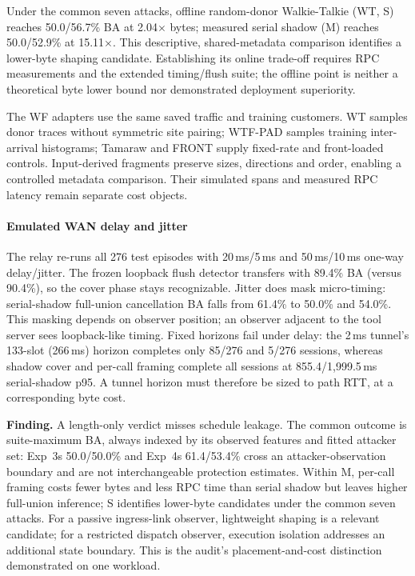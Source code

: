 Under the common seven attacks, offline random-donor Walkie-Talkie (WT, S) reaches 50.0/56.7\% BA at 2.04$\times$ bytes; measured serial shadow (M) reaches 50.0/52.9\% at 15.11$\times$. This descriptive, shared-metadata comparison identifies a lower-byte shaping candidate. Establishing its online trade-off requires RPC measurements and the extended timing/flush suite; the offline point is neither a theoretical byte lower bound nor demonstrated deployment superiority.

The WF adapters use the same saved traffic and training customers. WT samples donor traces without symmetric site pairing; WTF-PAD samples training inter-arrival histograms; Tamaraw and FRONT supply fixed-rate and front-loaded controls. Input-derived fragments preserve sizes, directions and order, enabling a controlled metadata comparison. Their simulated spans and measured RPC latency remain separate cost objects.

\paragraph{Emulated WAN delay and jitter}
The relay re-runs all 276 test episodes with 20\,ms/5\,ms and 50\,ms/10\,ms one-way delay/jitter. The frozen loopback flush detector transfers with 89.4\% BA (versus 90.4\%), so the cover phase stays recognizable. Jitter does mask micro-timing: serial-shadow full-union cancellation BA falls from 61.4\% to 50.0\% and 54.0\%. This masking depends on observer position; an observer adjacent to the tool server sees loopback-like timing. Fixed horizons fail under delay: the 2\,ms tunnel's 133-slot (266\,ms) horizon completes only 85/276 and 5/276 sessions, whereas shadow cover and per-call framing complete all sessions at 855.4/1,999.5\,ms serial-shadow p95. A tunnel horizon must therefore be sized to path RTT, at a corresponding byte cost.

\textbf{Finding.} A length-only verdict misses schedule leakage. The common outcome is suite-maximum BA, always indexed by its observed features and fitted attacker set: Exp~3\textquotesingle s 50.0/50.0\% and Exp~4\textquotesingle s 61.4/53.4\% cross an attacker-observation boundary and are not interchangeable protection estimates. Within M, per-call framing costs fewer bytes and less RPC time than serial shadow but leaves higher full-union inference; S identifies lower-byte candidates under the common seven attacks. For a passive ingress-link observer, lightweight shaping is a relevant candidate; for a restricted dispatch observer, execution isolation addresses an additional state boundary. This is the audit's placement-and-cost distinction demonstrated on one workload.
